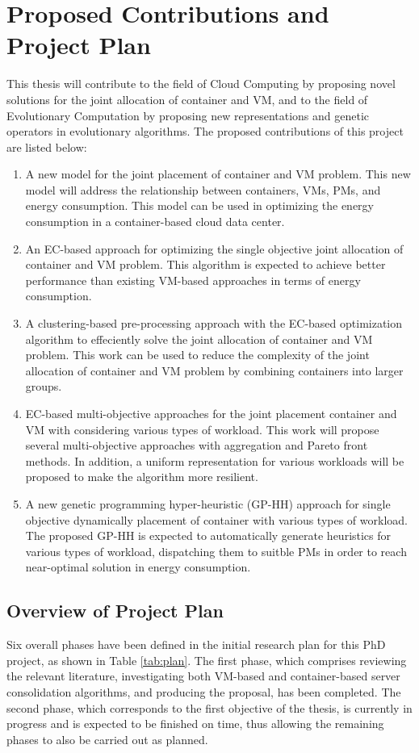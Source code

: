 \chapter{Proposed Contributions and Project Plan}\label{C:con}

This thesis will contribute to the field of Cloud Computing by proposing novel solutions for the joint allocation of container and VM, and to the field of Evolutionary Computation by proposing new representations and genetic operators in evolutionary algorithms. The proposed contributions of this project are listed below:
 
\begin{enumerate}
	\item A new model for the joint placement of container and VM problem. This new model will address the relationship between containers, VMs, PMs, and energy consumption. This model can be used in optimizing the energy consumption in a container-based cloud data center.
	\item An EC-based approach for optimizing the single objective joint allocation of container and VM problem. This algorithm is expected to achieve better performance than existing VM-based approaches in terms of energy consumption. 
	\item A clustering-based pre-processing approach with the EC-based optimization algorithm to effeciently solve the joint allocation of container and VM problem. This work can be used to reduce the complexity of the joint allocation of container and VM problem by combining containers into larger groups. 
	\item EC-based multi-objective approaches for the joint placement container and VM with considering various types of workload.
	This work will propose several multi-objective approaches with aggregation and Pareto front methods. In addition, a uniform representation for various workloads will be proposed to make the algorithm more resilient.
	\item A new genetic programming hyper-heuristic (GP-HH) approach for single objective  dynamically placement of container with various types of workload. The proposed GP-HH is expected to automatically generate heuristics for various types of workload, dispatching them to suitble PMs in order to reach near-optimal solution in energy consumption.
\end{enumerate}

\section{Overview of Project Plan}
Six overall phases have been defined in the initial research plan for this PhD project, as
shown in Table \ref{tab:plan}. The first phase, which comprises reviewing the relevant literature, investigating both VM-based and container-based server consolidation algorithms, and producing the proposal, has
been completed. The second phase, which corresponds to the first objective of the thesis, is
currently in progress and is expected to be finished on time, thus allowing the remaining
phases to also be carried out as planned.


